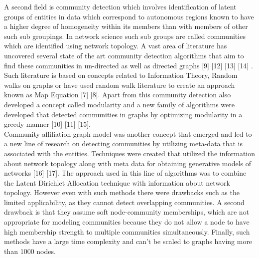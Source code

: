 \documentclass[conference]{IEEEtran}
\begin{document}
A second field is community detection which involves
identification of latent groups of entities in data which
correspond to autonomous regions known to have a higher
degree of homogeneity within its members than with members
of other such sub groupings. In network science such sub
groups are called communities which are identified using
network topology. A vast area of literature has uncovered
several state of the art community detection algorithms that
aim to find these communities in un-directed as well as
directed graphs [9] [12] [13] [14] . Such literature is based
on concepts related to Information Theory, Random walks
on graphs or have used random walk literature to create
an approach known as Map Equation [7] [8]. Apart from
this community detection also developed a concept called
modularity and a new family of algorithms were developed
that detected communities in graphs by optimizing modularity in a greedy manner [10] [11] [15].\\

Community affiliation graph model was another concept
that emerged and led to a new line of research on detecting
communities by utilizing meta-data that is associated with
the entities. Techniques were created that utilized the
information about network topology along with meta data
for obtaining generative models of networks [16] [17]. The
approach used in this line of algorithms was to combine the
Latent Dirichlet Allocation technique with information about
network topology. However even with such methods there
were drawbacks such as the limited applicability, as they
cannot detect overlapping communities. A second drawback
is that they assume soft node-community memberships, which
are not appropriate for modeling communities because they
do not allow a node to have high membership strength to
multiple communities simultaneously. Finally, such methods
have a large time complexity and can't be scaled to graphs
having more than 1000 nodes.\\
\end{document}
